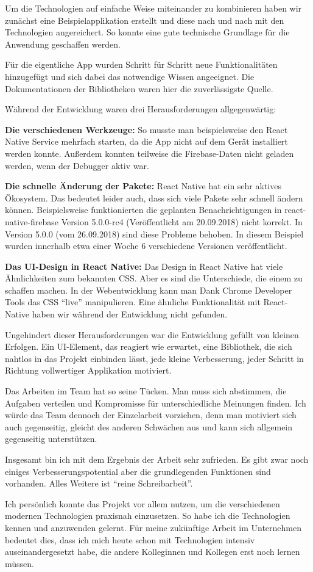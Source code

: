 Um die Technologien auf einfache Weise miteinander zu kombinieren haben wir zunächst eine
Beispielapplikation erstellt und diese nach und nach mit den Technologien angereichert.
So konnte eine gute technische Grundlage für die Anwendung geschaffen werden.

Für die eigentliche App wurden Schritt für Schritt neue Funktionalitäten hinzugefügt
und sich dabei das notwendige Wissen angeeignet.
Die Dokumentationen der Bibliotheken waren hier die zuverlässigste Quelle.

Während der Entwicklung waren drei Herausforderungen allgegenwärtig:

\textbf{Die verschiedenen Werkzeuge:}
So musste man beispielsweise den React Native Service mehrfach starten,
da die App nicht auf dem Gerät installiert werden konnte.
Außerdem konnten teilweise die Firebase-Daten nicht geladen werden,
wenn der Debugger aktiv war.

\textbf{Die schnelle Änderung der Pakete:}
React Native hat ein sehr aktives Ökosystem.
Das bedeutet leider auch,
dass sich viele Pakete sehr schnell ändern können.
Beispielsweise funktionierten die geplanten Benachrichtigungen in react-native-firebase Version 5.0.0-rc4 (Veröffentlicht am 20.09.2018) nicht korrekt.
In Version 5.0.0 (vom 26.09.2018) sind diese Probleme behoben. In diesem Beispiel wurden innerhalb etwa einer Woche 6 verschiedene Versionen veröffentlicht.

\textbf{Das UI-Design in React Native:}
Das Design in React Native hat viele Ähnlichkeiten zum bekannten CSS.
Aber es sind die Unterschiede, die einem zu schaffen machen.
In der Webentwicklung kann man Dank Chrome Developer Tools das CSS \enquote{live} manipulieren.
Eine ähnliche Funktionalität mit React-Native haben wir während der Entwicklung nicht gefunden.

Ungehindert dieser Herausforderungen war die Entwicklung gefüllt von kleinen Erfolgen.
Ein UI-Element, das reagiert wie erwartet,
eine Bibliothek, die sich nahtlos in das Projekt einbinden lässt,
jede kleine Verbesserung, jeder Schritt in Richtung vollwertiger Applikation motiviert.

Das Arbeiten im Team hat so seine Tücken.
Man muss sich abstimmen, die Aufgaben verteilen und Kompromisse für unterschiedliche Meinungen finden.
Ich würde das Team dennoch der Einzelarbeit vorziehen, denn man motiviert sich auch gegenseitig,
gleicht des anderen Schwächen aus und kann sich allgemein gegenseitig unterstützen.

Insgesamt bin ich mit dem Ergebnis der Arbeit sehr zufrieden.
Es gibt zwar noch einiges Verbesserungspotential aber die grundlegenden Funktionen sind vorhanden.
Alles Weitere ist \enquote{reine Schreibarbeit}.

Ich persönlich konnte das Projekt vor allem nutzen, um die verschiedenen modernen Technologien praxisnah einzusetzen.
So habe ich die Technologien kennen und anzuwenden gelernt.
Für meine zukünftige Arbeit im Unternehmen bedeutet dies,
dass ich mich heute schon mit Technologien intensiv auseinandergesetzt habe,
die andere Kolleginnen und Kollegen erst noch lernen müssen.